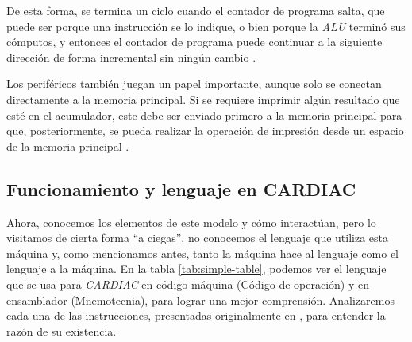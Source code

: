 \documentclass[letterpaper,12pt,oneside]{book}
\begin{document}
	De esta forma, se termina un ciclo cuando el contador de programa salta,
	 que puede ser porque una instrucción se lo indique, o bien porque
	la \textit{ALU} terminó sus cómputos, y entonces el contador de programa puede continuar
	 a la siguiente dirección de forma incremental
	sin ningún cambio \cite{fingerman_instruction_1968}.
	
	Los periféricos también juegan un papel importante, aunque solo se conectan
	directamente a la memoria principal. Si se requiere imprimir algún resultado que esté
	en el acumulador, este debe ser enviado primero
	a la memoria principal para que, posteriormente, se pueda realizar la operación de impresión desde un espacio de la memoria principal 
	\cite{fingerman_instruction_1968}.
	
	\subsection{Funcionamiento y lenguaje en CARDIAC}	
	
	Ahora, conocemos los elementos de este modelo y cómo interactúan, pero lo visitamos de cierta forma ``a ciegas'', no conocemos el lenguaje
	que utiliza esta máquina y, como mencionamos antes, tanto la máquina hace al lenguaje como el lenguaje a la máquina. En la tabla \ref{tab:simple-table}, podemos ver el lenguaje que se usa para  \textit{CARDIAC} en código máquina (Código de operación) y 
	en 	ensamblador (Mnemotecnia), para lograr una mejor comprensión. Analizaremos cada una de las instrucciones, presentadas
	originalmente en \cite{fingerman_instruction_1968}, para entender la razón de su 
	existencia.
	
\end{document}
